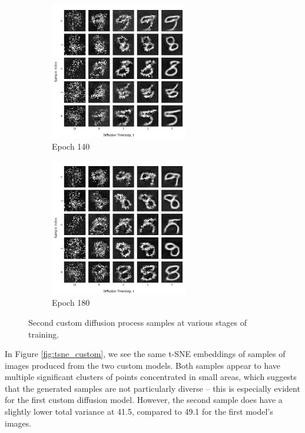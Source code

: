 \documentclass[12pt]{article}
\begin{document}
\begin{figure}[hp]
    \begin{subfigure}{0.49\textwidth}
    \includegraphics[width=0.9\linewidth, height=6cm, center]{figures/diffusion_plot_10_0140.png}
    \caption{Epoch 140}
    \label{fig:10_140}
    \end{subfigure}
    \begin{subfigure}{0.49\textwidth}
    \includegraphics[width=0.9\linewidth, height=6cm, center]{figures/diffusion_plot_10_0180.png}
    \caption{Epoch 180}
    \label{fig:10_180}
    \end{subfigure}

    \caption{Second custom diffusion process samples at various stages of training.}
    \label{fig:diffusion_10}
\end{figure}

In Figure \ref{fig:tsne_custom}, we see the same t-SNE embeddings of samples of images produced from the two custom models.
Both samples appear to have multiple significant clusters of points concentrated in small areas,
which suggests that the generated samples are not particularly diverse -- this is especially evident for the first custom diffusion model.
However, the second sample does have a slightly lower total variance at 41.5, compared to 49.1 for the first model's images.
\end{document}
